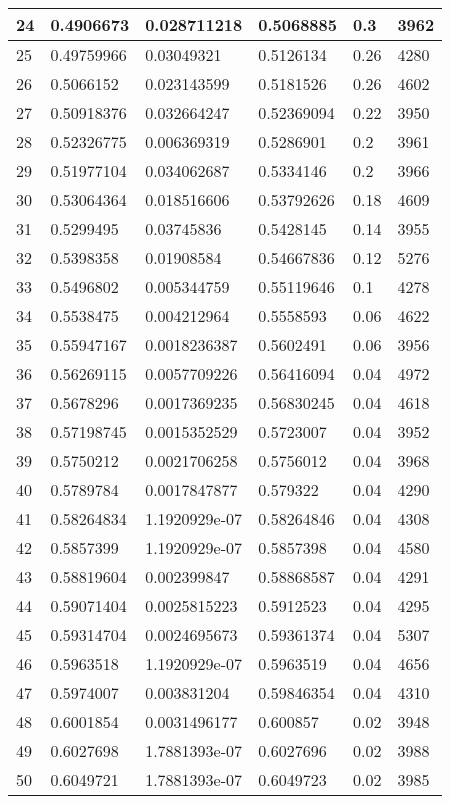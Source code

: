 \begin{longtable}{|l|l|l|l|l|l|}
24 & 0.4906673 & 0.028711218 & 0.5068885 & 0.3 & 3962 \\ \hline 
25 & 0.49759966 & 0.03049321 & 0.5126134 & 0.26 & 4280 \\ \hline 
26 & 0.5066152 & 0.023143599 & 0.5181526 & 0.26 & 4602 \\ \hline 
27 & 0.50918376 & 0.032664247 & 0.52369094 & 0.22 & 3950 \\ \hline 
28 & 0.52326775 & 0.006369319 & 0.5286901 & 0.2 & 3961 \\ \hline 
29 & 0.51977104 & 0.034062687 & 0.5334146 & 0.2 & 3966 \\ \hline 
30 & 0.53064364 & 0.018516606 & 0.53792626 & 0.18 & 4609 \\ \hline 
31 & 0.5299495 & 0.03745836 & 0.5428145 & 0.14 & 3955 \\ \hline 
32 & 0.5398358 & 0.01908584 & 0.54667836 & 0.12 & 5276 \\ \hline 
33 & 0.5496802 & 0.005344759 & 0.55119646 & 0.1 & 4278 \\ \hline 
34 & 0.5538475 & 0.004212964 & 0.5558593 & 0.06 & 4622 \\ \hline 
35 & 0.55947167 & 0.0018236387 & 0.5602491 & 0.06 & 3956 \\ \hline 
36 & 0.56269115 & 0.0057709226 & 0.56416094 & 0.04 & 4972 \\ \hline 
37 & 0.5678296 & 0.0017369235 & 0.56830245 & 0.04 & 4618 \\ \hline 
38 & 0.57198745 & 0.0015352529 & 0.5723007 & 0.04 & 3952 \\ \hline 
39 & 0.5750212 & 0.0021706258 & 0.5756012 & 0.04 & 3968 \\ \hline 
40 & 0.5789784 & 0.0017847877 & 0.579322 & 0.04 & 4290 \\ \hline 
41 & 0.58264834 & 1.1920929e-07 & 0.58264846 & 0.04 & 4308 \\ \hline 
42 & 0.5857399 & 1.1920929e-07 & 0.5857398 & 0.04 & 4580 \\ \hline 
43 & 0.58819604 & 0.002399847 & 0.58868587 & 0.04 & 4291 \\ \hline 
44 & 0.59071404 & 0.0025815223 & 0.5912523 & 0.04 & 4295 \\ \hline 
45 & 0.59314704 & 0.0024695673 & 0.59361374 & 0.04 & 5307 \\ \hline 
46 & 0.5963518 & 1.1920929e-07 & 0.5963519 & 0.04 & 4656 \\ \hline 
47 & 0.5974007 & 0.003831204 & 0.59846354 & 0.04 & 4310 \\ \hline 
48 & 0.6001854 & 0.0031496177 & 0.600857 & 0.02 & 3948 \\ \hline 
49 & 0.6027698 & 1.7881393e-07 & 0.6027696 & 0.02 & 3988 \\ \hline 
50 & 0.6049721 & 1.7881393e-07 & 0.6049723 & 0.02 & 3985 \\ \hline 
\end{longtable}